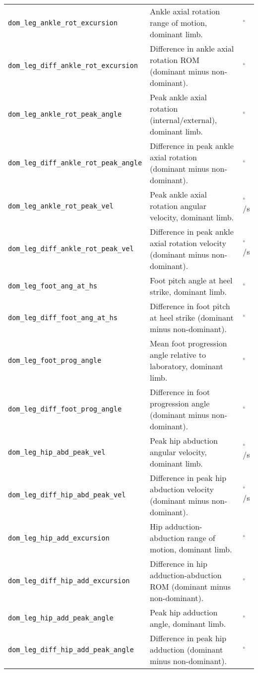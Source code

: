 {\begin{longtable}{@{}p{} p{} p{}@{}}
    \texttt{dom\_leg\_ankle\_rot\_excursion} & Ankle axial rotation range of motion, dominant limb. & $^\circ$ \\
    \texttt{dom\_leg\_diff\_ankle\_rot\_excursion} & Difference in ankle axial rotation ROM (dominant minus non-dominant). & $^\circ$ \\
    \texttt{dom\_leg\_ankle\_rot\_peak\_angle} & Peak ankle axial rotation (internal/external), dominant limb. & $^\circ$ \\
    \texttt{dom\_leg\_diff\_ankle\_rot\_peak\_angle} & Difference in peak ankle axial rotation (dominant minus non-dominant). & $^\circ$ \\
    \texttt{dom\_leg\_ankle\_rot\_peak\_vel} & Peak ankle axial rotation angular velocity, dominant limb. & $^\circ$/s \\
    \texttt{dom\_leg\_diff\_ankle\_rot\_peak\_vel} & Difference in peak ankle axial rotation velocity (dominant minus non-dominant). & $^\circ$/s \\
    \texttt{dom\_leg\_foot\_ang\_at\_hs} & Foot pitch angle at heel strike, dominant limb. & $^\circ$ \\
    \texttt{dom\_leg\_diff\_foot\_ang\_at\_hs} & Difference in foot pitch at heel strike (dominant minus non-dominant). & $^\circ$ \\
    \texttt{dom\_leg\_foot\_prog\_angle} & Mean foot progression angle relative to laboratory, dominant limb. & $^\circ$ \\
    \texttt{dom\_leg\_diff\_foot\_prog\_angle} & Difference in foot progression angle (dominant minus non-dominant). & $^\circ$ \\
    \texttt{dom\_leg\_hip\_abd\_peak\_vel} & Peak hip abduction angular velocity, dominant limb. & $^\circ$/s \\
    \texttt{dom\_leg\_diff\_hip\_abd\_peak\_vel} & Difference in peak hip abduction velocity (dominant minus non-dominant). & $^\circ$/s \\
    \texttt{dom\_leg\_hip\_add\_excursion} & Hip adduction-abduction range of motion, dominant limb. & $^\circ$ \\
    \texttt{dom\_leg\_diff\_hip\_add\_excursion} & Difference in hip adduction-abduction ROM (dominant minus non-dominant). & $^\circ$ \\
    \texttt{dom\_leg\_hip\_add\_peak\_angle} & Peak hip adduction angle, dominant limb. & $^\circ$ \\
    \texttt{dom\_leg\_diff\_hip\_add\_peak\_angle} & Difference in peak hip adduction (dominant minus non-dominant). & $^\circ$ \\

\end{longtable}}
